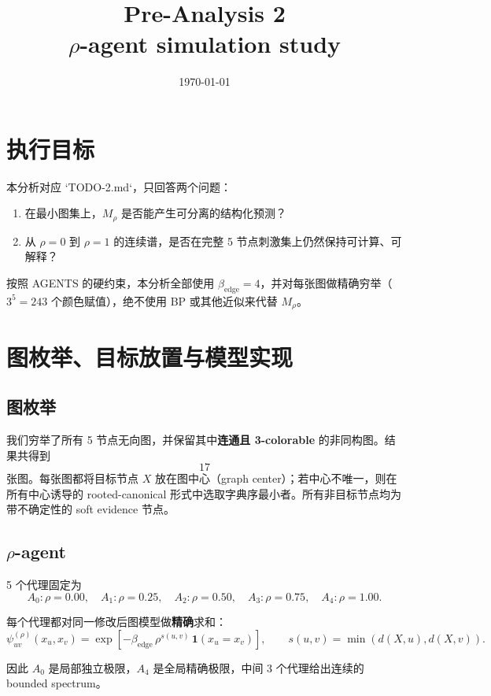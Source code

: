 \documentclass[11pt,a4paper]{ctexart}
\title{Pre-Analysis 2\\[4pt]
\large \texorpdfstring{$\rho$}{rho}-agent simulation study}
\author{}
\date{\today}
\begin{document}
\maketitle

\tableofcontents
\bigskip

\section{执行目标}

本分析对应 `TODO-2.md`，只回答两个问题：
\begin{enumerate}
    \item 在最小图集上，$M_\rho$ 是否能产生可分离的结构化预测？
    \item 从 $\rho=0$ 到 $\rho=1$ 的连续谱，是否在完整 5 节点刺激集上仍然保持可计算、可解释？
\end{enumerate}

按照 AGENTS 的硬约束，本分析全部使用 $\beta_{\mathrm{edge}}=4$，并对每张图做精确穷举（$3^5=243$ 个颜色赋值），绝不使用 BP 或其他近似来代替 $M_\rho$。

\section{图枚举、目标放置与模型实现}

\subsection{图枚举}

我们穷举了所有 5 节点无向图，并保留其中\textbf{连通且 3-colorable} 的非同构图。结果共得到
\[
17
\]
张图。每张图都将目标节点 $X$ 放在图中心（graph center）；若中心不唯一，则在所有中心诱导的 rooted-canonical 形式中选取字典序最小者。所有非目标节点均为带不确定性的 soft evidence 节点。

\subsection{\texorpdfstring{$\rho$}{rho}-agent}

5 个代理固定为
\[
A_0: \rho=0.00,\quad
A_1: \rho=0.25,\quad
A_2: \rho=0.50,\quad
A_3: \rho=0.75,\quad
A_4: \rho=1.00.
\]

每个代理都对同一修改后图模型做\textbf{精确}求和：
\[
\psi^{(\rho)}_{uv}(x_u,x_v)
=
\exp\!\left[-\beta_{\mathrm{edge}}\,\rho^{s(u,v)}\,\mathbf{1}(x_u=x_v)\right],
\qquad
s(u,v)=\min(d(X,u),d(X,v)).
\]

因此 $A_0$ 是局部独立极限，$A_4$ 是全局精确极限，中间 3 个代理给出连续的 bounded spectrum。
\end{document}
